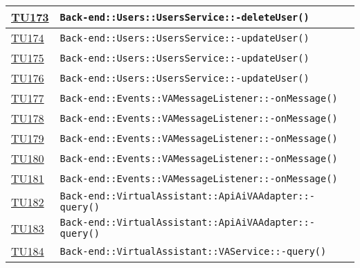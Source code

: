 \begin{longtable}{|>{\centering}m{1cm}|m{12cm}<{\centering}|}
\hyperlink{TU173}{TU173} & \texttt{Back-end::Users::UsersService::-\linebreak deleteUser()}\\ \hline

\hyperlink{TU174}{TU174} & \texttt{Back-end::Users::UsersService::-\linebreak updateUser()}\\ \hline

\hyperlink{TU175}{TU175} & \texttt{Back-end::Users::UsersService::-\linebreak updateUser()}\\ \hline

\hyperlink{TU176}{TU176} & \texttt{Back-end::Users::UsersService::-\linebreak updateUser()}\\ \hline

\hyperlink{TU177}{TU177} & \texttt{Back-end::Events::VAMessageListener::-\linebreak onMessage()}\\ \hline

\hyperlink{TU178}{TU178} & \texttt{Back-end::Events::VAMessageListener::-\linebreak onMessage()}\\ \hline

\hyperlink{TU179}{TU179} & \texttt{Back-end::Events::VAMessageListener::-\linebreak onMessage()}\\ \hline

\hyperlink{TU180}{TU180} & \texttt{Back-end::Events::VAMessageListener::-\linebreak onMessage()}\\ \hline

\hyperlink{TU181}{TU181} & \texttt{Back-end::Events::VAMessageListener::-\linebreak onMessage()}\\ \hline

\hyperlink{TU182}{TU182} & \texttt{Back-end::VirtualAssistant::ApiAiVAAdapter::-\linebreak query()}\\ \hline

\hyperlink{TU183}{TU183} & \texttt{Back-end::VirtualAssistant::ApiAiVAAdapter::-\linebreak query()}\\ \hline

\hyperlink{TU184}{TU184} & \texttt{Back-end::VirtualAssistant::VAService::-\linebreak query()}\\ \hline


\end{longtable}
